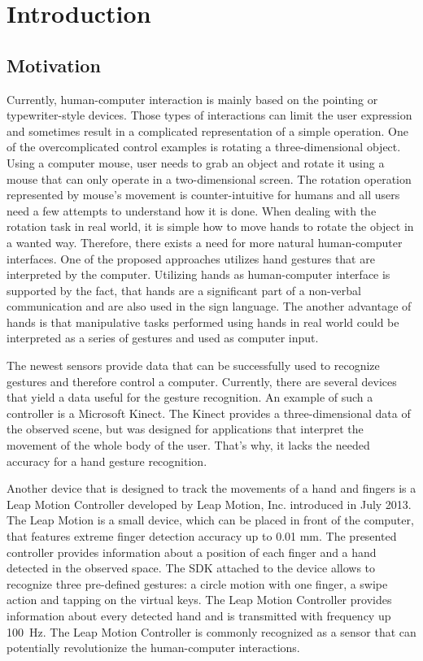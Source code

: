 
\chapter{Introduction} %

\section{Motivation}

Currently, human-computer interaction is mainly based on the pointing or typewriter-style devices. 
Those types of interactions can limit the user expression and sometimes result in a complicated representation of a simple operation.
One of the overcomplicated control examples is rotating a three-dimensional object.
Using a computer mouse, user needs to grab an object and rotate it using a mouse that can only operate in a two-dimensional screen. 
The rotation operation represented by mouse's movement is counter-intuitive for humans and all users need a few attempts to understand how it is done. 
When dealing with the rotation task in real world, it is simple how to move hands to rotate the object in a wanted way.
Therefore, there exists a need for more natural human-computer interfaces.
One of the proposed approaches utilizes hand gestures that are interpreted by the computer.
Utilizing hands as human-computer interface is supported by the fact, that hands are a significant part of a non-verbal communication and are also used in the sign language.
The another advantage of hands is that manipulative tasks performed using hands in real world could be interpreted as a series of gestures and used as computer input.

The newest sensors provide data that can be successfully used to recognize gestures and therefore control a computer.
Currently, there are several devices that yield a data useful for the gesture recognition. 
An example of such a controller is a Microsoft Kinect.
The Kinect provides a three-dimensional data of the observed scene, but was designed for applications that interpret the movement of the whole body of the user. 
That's why, it lacks the needed accuracy for a hand gesture recognition.
 
Another device that is designed to track the movements of a hand and fingers is a Leap Motion Controller developed by Leap Motion, Inc. introduced in July 2013. 
The Leap Motion is a small device, which can be placed in front of the computer, that features extreme finger detection accuracy up to 0.01 mm. 
The presented controller provides information about a position of each finger and a hand detected in the observed space.
The SDK attached to the device allows to recognize three pre-defined gestures: a circle motion with one finger, a swipe action and tapping on the virtual keys. 
The Leap Motion Controller provides information about every detected hand and is transmitted with frequency up 100~Hz. 
The Leap Motion Controller is commonly recognized as a sensor that can potentially revolutionize the human-computer interactions. 

